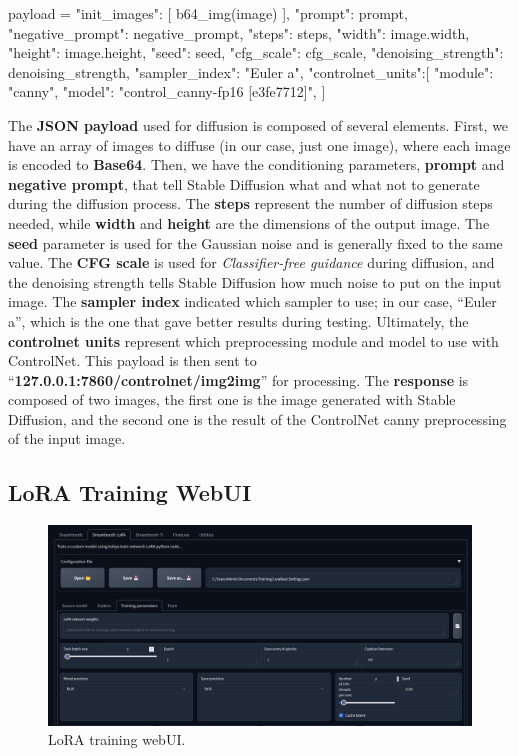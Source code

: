 \documentclass[preprint]{elsarticle}
\begin{document}
\begin{python}
	payload = {
		"init_images": [
		b64_img(image)
		],
		"prompt": prompt,
		"negative_prompt": negative_prompt,
		"steps": steps,
		"width": image.width,
		"height": image.height,
		"seed": seed,
		"cfg_scale": cfg_scale,
		"denoising_strength": denoising_strength,
		"sampler_index": "Euler a",
		"controlnet_units":[
		{
			"module": "canny",
			"model": "control_canny-fp16 [e3fe7712]",
		}
		]
	}
\end{python}

The \textbf{JSON payload} used for diffusion is composed of several elements.
First, we have an array of images to diffuse (in our case, just one image), 
where each image is encoded to \textbf{Base64}. 
Then, we have the conditioning parameters, \textbf{prompt} and \textbf{negative prompt}, 
that tell Stable Diffusion what and what not to generate during the diffusion process. 
The \textbf{steps} represent the number of diffusion steps needed, while \textbf{width} 
and \textbf{height} are the dimensions of the output image. 
The \textbf{seed} parameter is used for the Gaussian noise and is generally fixed to the same value. 
The \textbf{CFG scale} is used for \emph{Classifier-free guidance} during diffusion, 
and the denoising strength tells Stable Diffusion how much noise to put on the input image. 
The \textbf{sampler index} indicated which sampler to use; in our case, ``Euler a'', 
which is the one that gave better results during testing.
Ultimately, the \textbf{controlnet units} represent which preprocessing module and model to use with ControlNet.
This payload is then sent to ``\textbf{127.0.0.1:7860/controlnet/img2img}'' for processing. 
The \textbf{response} is composed of two images, the first one is the image generated with Stable Diffusion, 
and the second one is the result of the ControlNet canny preprocessing of the input image.

\subsection{LoRA Training WebUI} \label{sec:lora_training_webui}

\begin{figure}[H]
	\centering
	\includegraphics[width=15cm, keepaspectratio]{img/project_img/lora.png} 
	\caption{LoRA training webUI.}
	\label{fig:lora-webui}
\end{figure}
\end{document}
